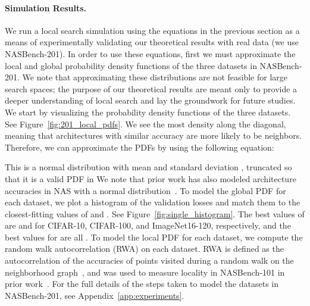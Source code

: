 \paragraph{Simulation Results.}
We run a local search simulation using the equations in
the previous section
as a means of experimentally validating our theoretical results
with real data (we use NASBench-201).
In order to use these equations, first we must approximate the local
and global probability density functions of the three 
datasets in NASBench-201.
We note that approximating these distributions are not feasible for large search
spaces; the purpose of our theoretical results are meant only to provide a deeper
understanding of local search and lay the groundwork for future studies.
We start by visualizing the probability density functions of the three datasets.
See Figure~\ref{fig:201_local_pdfs}.
We see the most density along the diagonal, meaning that architectures
with similar accuracy are more likely to be neighbors.
Therefore, we can approximate the PDFs by using the following equation:










This is a normal distribution with mean  
and standard deviation , truncated so that it is a valid PDF
in 
We note that prior work has also modeled architecture accuracies in NAS with
a normal distribution~\citep{real2019regularized}.
To model the global PDF for each dataset,
we plot a histogram of the validation losses and match them to the closest-fitting
values of  and .
See Figure~\ref{fig:single_histogram}.
The best values of  are  and  for CIFAR-10, CIFAR-100, 
and ImageNet16-120, respectively, and the best values for  are all .
To model the local PDF for each dataset, we compute
the random walk autocorrelation (RWA) on each dataset.
RWA is defined as the autocorrelation of the accuracies of points visited during a
random walk on the neighborhood 
graph~\citep{weinberger1990correlated, stadler1996landscapes},
and was used to measure locality in NASBench-101 in prior work~\citep{nasbench}.
For the full details of the steps taken to model the datasets in NASBench-201, 
see Appendix~\ref{app:experiments}.






